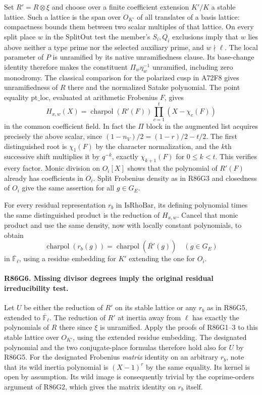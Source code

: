 Set $R'=R\otimes\xi$ and choose over a finite coefficient extension
$K'/K$ a stable lattice. Such a lattice is the span over $O_{K'}$
of all translates of a basis lattice: compactness bounds them
between two scalar multiples of that lattice. On every split
place $w$ in the $\mathrm{SplitOut}$ test the member's $S_i,Q_i$
exclusions imply that $w$ lies above neither a type prime nor the
selected auxiliary prime, and $w\nmid\ell$. The local parameter of
$P$ is unramified by its native unramifiedness clause.
Its base-change identity therefore makes the constituent
$\Pi_w\eta_w^{-1}$ unramified, including zero monodromy.
The classical comparison for the polarized cusp in A72F8 gives
unramifiedness of $R$ there and the normalized Satake polynomial.
The point equality $\mathrm{pt\_loc}$, evaluated at arithmetic
Frobenius $F$, gives
\[
  H_{x,w}(X)=\operatorname{charpol}(R'(F))
                  \prod_{c=1}^{t}(X-\chi_c(F))
\]
in the common coefficient field. In fact the $\Pi$ block in the
augmented list acquires precisely the above scalar, since
$(1-n_V)/2=(1-r)/2-t/2$. The first distinguished root is
$\chi_1(F)$ by the character normalization, and the $k$th
successive shift multiplies it by $q^{-k}$, exactly
$\chi_{k+1}(F)$ for $0\le k<t$. This verifies every factor.
Monic division on $O_i[X]$ shows that the polynomial of $R'(F)$
already has coefficients in $O_i$. Split Frobenius density as in
R86G3 and closedness of $O_i$ give the same assertion for all
$g\in G_E$.

For every residual representation $r_b$ in $\mathrm{IsRhoBar}$,
its defining polynomial times the same distinguished product is
the reduction of $H_{x,w}$. Cancel that monic product and use the
same density, now with locally constant polynomials, to obtain
\[
 \operatorname{charpol}(r_b(g))=
       \operatorname{charpol}(\overline{R'}(g))\quad(g\in G_E)
\]
in $\overline{\mathbb F}_\ell$, using a residue embedding for
$K'$ extending the one for $O_i$.

\paragraph{R86G6. Missing divisor degrees imply the original residual irreducibility test.}
Let $U$ be either the reduction of $R'$ on its stable lattice
or any $r_b$ as in R86G5, extended to $\overline{\mathbb F}_\ell$.
The reduction of $R'$ at inertia away from $\ell$ has exactly the
polynomials of $R$ there since $\xi$ is unramified. Apply the
proofs of R86G1--3 to this stable lattice over $O_{K'}$, using the
extended residue embedding. The designated polynomial and the
two conjugate-place formulas therefore hold also for $U$ by
R86G5. For the designated Frobenius \emph{matrix} identity on an
arbitrary $r_b$, note that its wild inertia polynomial is
$(X-1)^r$ by the same equality. Its kernel is open by assumption.
Its wild image is consequently trivial by the coprime-orders
argument of R86G2, which gives the matrix identity on $r_b$ itself.

